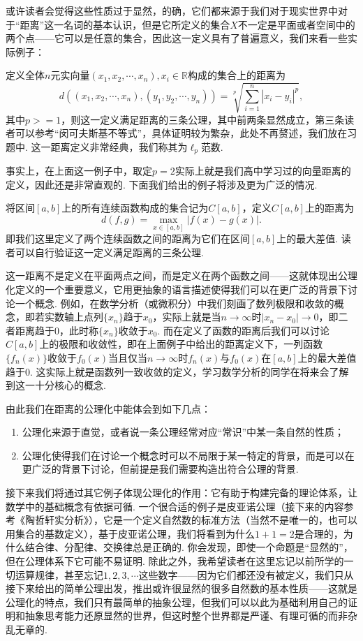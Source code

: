 或许读者会觉得这些性质过于显然，的确，它们都来源于我们对于现实世界中对于``距离''这一名词的基本认识，但是它所定义的集合$X$不一定是平面或者空间中的两个点——它可以是任意的集合，因此这一定义具有了普遍意义，我们来看一些实际例子：

\begin{example*}
    定义全体$n$元实向量$(x_1,x_2,\cdots,x_n),x_i\in \mathbb{R}$构成的集合上的距离为
    \[d((x_1,x_2,\cdots,x_n),(y_1,y_2,\cdots,y_n))=\sqrt[p]{\sum_{i=1}^n|x_i-y_i|^p},\]
    其中$p>=1$，则这一定义满足距离的三条公理，其中前两条显然成立，第三条读者可以参考``闵可夫斯基不等式''，具体证明较为繁杂，此处不再赘述，我们放在习题中. 这一距离定义非常经典，我们称其为$\ell_p$范数.
\end{example*}

事实上，在上面这一例子中，取定$p=2$实际上就是我们高中学习过的向量距离的定义，因此还是非常直观的. 下面我们给出的例子将涉及更为广泛的情况.

\begin{example*}
    将区间$[a,b]$上的所有连续函数构成的集合记为$C[a,b]$，定义$C[a,b]$上的距离为
    \[d(f,g)=\max_{x\in [a,b]}|f(x)-g(x)|.\]
    即我们这里定义了两个连续函数之间的距离为它们在区间$[a,b]$上的最大差值. 读者可以自行验证这一定义满足距离的三条公理.
\end{example*}

这一距离不是定义在平面两点之间，而是定义在两个函数之间——这就体现出公理化定义的一个重要意义，它用更抽象的语言描述使得我们可以在更广泛的背景下讨论一个概念. 例如，在数学分析（或微积分）中我们刻画了数列极限和收敛的概念，即若实数轴上点列$\{x_n\}$趋于$x_0$，实际上就是当$n\to\infty$时$|x_n-x_0|\to 0$，即二者距离趋于0，此时称$\{x_n\}$收敛于$x_0$. 而在定义了函数的距离后我们可以讨论$C[a,b]$上的极限和收敛性，即在上面例子中给出的距离定义下，一列函数$\{f_n(x)\}$收敛于$f_0(x)$当且仅当$n\to\infty$时$f_n(x)$与$f_0(x)$在$[a,b]$上的最大差值趋于0. 这实际上就是函数列一致收敛的定义，学习数学分析的同学在将来会了解到这一十分核心的概念.

由此我们在距离的公理化中能体会到如下几点：
\begin{enumerate}
    \item 公理化来源于直觉，或者说一条公理经常对应``常识''中某一条自然的性质；
    \item 公理化使得我们在讨论一个概念时可以不局限于某一特定的背景，而是可以在更广泛的背景下讨论，但前提是我们需要构造出符合公理的背景.
\end{enumerate}

接下来我们将通过其它例子体现公理化的作用：它有助于构建完备的理论体系，让数学中的基础概念有依据可循. 一个很合适的例子是皮亚诺公理（接下来的内容参考《陶哲轩实分析》），它是一个定义自然数的标准方法（当然不是唯一的，也可以用集合的基数定义），基于皮亚诺公理，我们将看到为什么$1+1=2$是合理的，为什么结合律、分配律、交换律总是正确的. 你会发现，即使一个命题是``显然的''，但在公理体系下它可能不易证明. 除此之外，我希望读者在这里忘记以前所学的一切运算规律，甚至忘记$1,2,3,\cdots$这些数字——因为它们都还没有被定义，我们只从接下来给出的简单公理出发，推出或许很显然的很多自然数的基本性质——这就是公理化的特点，我们只有最简单的抽象公理，但我们可以以此为基础利用自己的证明和抽象思考能力还原显然的世界，但这时整个世界都是严谨、有理可循的而非杂乱无章的.

